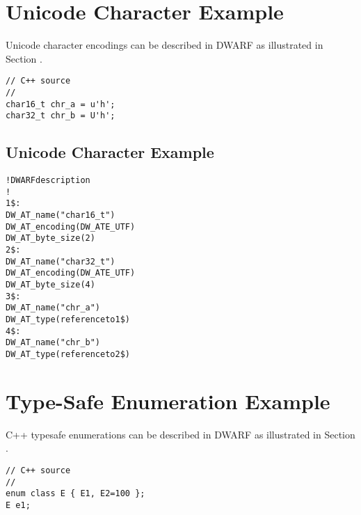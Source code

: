 \section{Unicode Character Example}
\label{app:unicodecharacterexample}

Unicode character encodings can be described in DWARF as
illustrated in 
Section .

\begin{lstlisting}
// C++ source
//
char16_t chr_a = u'h';
char32_t chr_b = U'h';
\end{lstlisting}

\subsection{Unicode Character Example}
\label{app:unicodecharacterexamplesub}
\begin{alltt}

! DWARF description
!
1\$: 
        DW\-\_AT\-\_name("char16\_t")
        DW\-\_AT\-\_encoding(DW\-\_ATE\-\_UTF)
        DW\-\_AT\-\_byte\-\_size(2)
2\$: 
        DW\-\_AT\-\_name("char32\_t")
        DW\-\_AT\-\_encoding(DW\-\_ATE\-\_UTF)
        DW\-\_AT\-\_byte\-\_size(4)
3\$: 
        DW\-\_AT\-\_name("chr\_a")
        DW\-\_AT\-\_type(reference to 1\$)
4\$: 
        DW\-\_AT\-\_name("chr\_b")
        DW\-\_AT\-\_type(reference to 2\$)
\end{alltt}



\section{Type-Safe Enumeration Example}
\label{app:typesafeenumerationexample}


C++ type\dash safe enumerations can be described in DWARF as illustrated in 
Section .

\begin{lstlisting}
// C++ source
//
enum class E { E1, E2=100 };
E e1;
\end{lstlisting}

